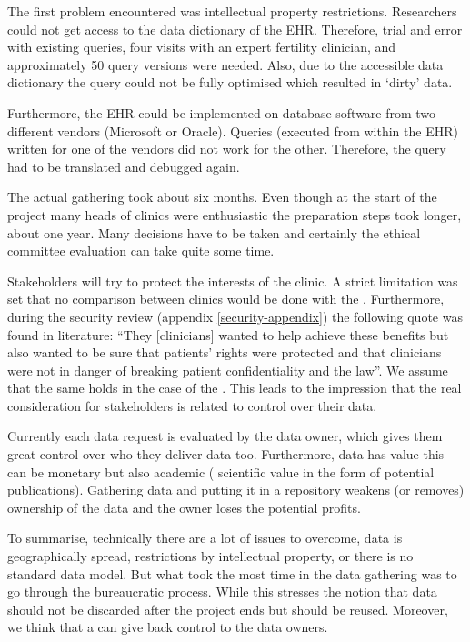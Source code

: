 The first problem encountered was intellectual property restrictions.
Researchers could not get access to the data dictionary of the EHR.
Therefore, trial and error with existing queries, four visits with an expert fertility clinician, and approximately 50 query versions were needed.
Also, due to the accessible data dictionary the query could not be fully optimised which resulted in `dirty' data.

Furthermore, the EHR could be implemented on database software from two different vendors (Microsoft or Oracle).
Queries (executed from within the EHR) written for one of the vendors did not work for the other.
Therefore, the query had to be translated and debugged again.

The actual gathering took about six months.
Even though at the start of the project many heads of clinics were enthusiastic the preparation steps took longer, about one year.
Many decisions have to be taken and certainly the ethical committee evaluation can take quite some time.

Stakeholders will try to protect the interests of the clinic.
A strict limitation was set that no comparison between clinics would be done with the \projectdata{}.
Furthermore, during the security review (appendix \ref{security-appendix}) the following quote was found in literature: ``They [clinicians] wanted to help achieve these benefits but also wanted to be sure that patients' rights were protected and that clinicians were not in danger of breaking patient confidentiality and the law''.
We assume that the same holds in the case of the \project{}.
This leads to the impression that the real consideration for stakeholders is related to control over their data.

Currently each data request is evaluated by the data owner, which gives them great control over who they deliver data too.
Furthermore, data has value this can be monetary but also academic (\ie{} scientific value in the form of potential publications).
Gathering data and putting it in a repository weakens (or removes) ownership of the data and the owner loses the potential profits.

To summarise, technically there are a lot of issues to overcome, \eg{} data is geographically spread, restrictions by intellectual property, or there is no standard data model.
But what took the most time in the \project{} data gathering was to go through the bureaucratic process.
While this stresses the notion that data should not be discarded after the project ends but should be reused.
Moreover, we think that a \ivfsystem{} can give back control to the data owners.


